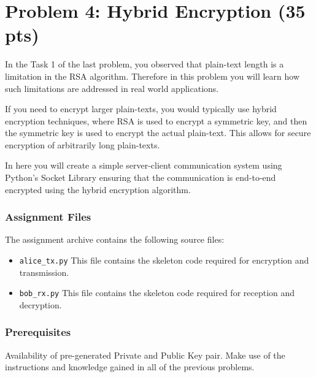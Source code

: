 \documentclass[11pt,letterpaper]{article}
\begin{document}

\newpage

\section*{Problem 4: Hybrid Encryption ({35 pts})}
In the Task 1 of the last problem, you observed that plain-text length is a limitation  in the RSA algorithm. Therefore in this problem you will learn how such limitations are addressed in real world applications.

\medskip

If you need to encrypt larger plain-texts, you would typically use hybrid encryption techniques, where RSA is used to encrypt a symmetric key, and then the symmetric key is used to encrypt the actual plain-text. This allows for secure encryption of arbitrarily long plain-texts.

\medskip

In here you will create a simple server-client communication system using Python's Socket Library ensuring that the communication is end-to-end encrypted using the hybrid encryption algorithm. 


\medskip
\subsubsection*{Assignment Files}
The assignment archive contains the following source files:

\begin{itemize}[nolistsep]
	\item \texttt{alice\_tx.py} This file contains the skeleton code required for encryption and transmission.
	\item \texttt{bob\_rx.py} This file contains the skeleton code required for reception and decryption.
\end{itemize}


\subsubsection*{Prerequisites}

\noindent Availability of pre-generated Private and Public Key pair. Make use of the instructions and knowledge gained in all of the previous problems.
\end{document}
